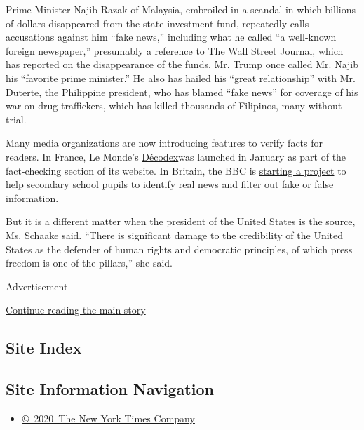 Prime Minister Najib Razak of Malaysia, embroiled in a scandal in which
billions of dollars disappeared from the state investment fund,
repeatedly calls accusations against him ``fake news,'' including what
he called ``a well-known foreign newspaper,'' presumably a reference to
The Wall Street Journal, which has reported on
th\href{http://www.wsj.com/specialcoverage/malaysia-controversy}{e
disappearance of the funds}. Mr. Trump once called Mr. Najib his
``favorite prime minister.'' He also has hailed his ``great
relationship'' with Mr. Duterte, the Philippine president, who has
blamed ``fake news'' for coverage of his war on drug traffickers, which
has killed thousands of Filipinos, many without trial.

Many media organizations are now introducing features to verify facts
for readers. In France, Le Monde's
\href{http://www.lemonde.fr/verification/}{Décodex}was launched in
January as part of the fact-checking section of its website. In Britain,
the BBC is
\href{http://www.bbc.com/news/entertainment-arts-42242630}{starting a
project} to help secondary school pupils to identify real news and
filter out fake or false information.

But it is a different matter when the president of the United States is
the source, Ms. Schaake said. ``There is significant damage to the
credibility of the United States as the defender of human rights and
democratic principles, of which press freedom is one of the pillars,''
she said.

Advertisement

\protect\hyperlink{after-bottom}{Continue reading the main story}

\hypertarget{site-index}{%
\subsection{Site Index}\label{site-index}}

\hypertarget{site-information-navigation}{%
\subsection{Site Information
Navigation}\label{site-information-navigation}}

\begin{itemize}
\tightlist
\item
  \href{https://help.nytimes3xbfgragh.onion/hc/en-us/articles/115014792127-Copyright-notice}{©~2020~The
  New York Times Company}
\end{itemize}

